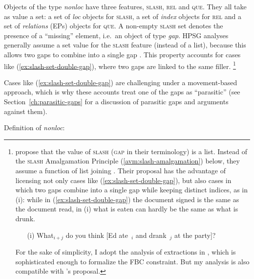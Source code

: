 Objects of the type \emph{nonloc} have three features, \textsc{slash}, \textsc{rel} and \textsc{que}. They all take as value a set: a set of \emph{loc} objects for \textsc{slash}, a set of \emph{index} objects for \textsc{rel} and a set of \emph{relations} (EPs) objects for \textsc{que}.
A non-empty \textsc{slash} set denotes the presence of a ``missing'' element, i.e.\ an object of type \emph{gap}.
HPSG analyses generally assume a set value for the \textsc{slash} feature (instead of a list), because this allows two gaps to combine into a single gap \citep{Pollard.1990}. This property accounts for cases like (\ref{ex:slash-set-double-gap}), where two gaps are linked to the same filler.%
\footnote{\citet{Chaves.2020.UDC} propose that the value of \textsc{slash} (\textsc{gap} in their terminology) is a list. Instead of the \textsc{slash} Amalgamation Principle (\ref{avm:slash-amalgamation}) below, they assume a function of list joining \citep[248]{Chaves.2020.UDC}. Their proposal has the advantage of licensing not only cases like (\ref{ex:slash-set-double-gap}), but also cases in which two gaps combine into a single gap while keeping distinct indices, as in (i): while in (\ref{ex:slash-set-double-gap}) the document signed is the same as the document read, in (i) what is eaten can hardly be the same as what is drunk.
\begin{itemize}
    \item[(i)] What$_{i+j}$ do you think [Ed ate~\trace{}$_i$ and drank~\trace{}$_j$ at the party]? \citep[246]{Chaves.2020.UDC} 
\end{itemize}
For the sake of simplicity, I adopt the analysis of extractions in \citet{Borsley.2020.HPSG.UDC}, which is sophisticated enough to formalize the FBC constraint. But my analysis is also compatible with \citeauthor{Chaves.2020.UDC}'s proposal.}

\label{ex:slash-set-double-gap}
\z 

Cases like (\ref{ex:slash-set-double-gap}) are challenging under a movement-based approach, which is why these accounts treat one of the gaps as ``parasitic'' (see Section~\ref{ch:parasitic-gaps} for a discussion of parasitic gaps and arguments against them). 

\ea Definition of \emph{nonloc}:\nopagebreak

\z 

